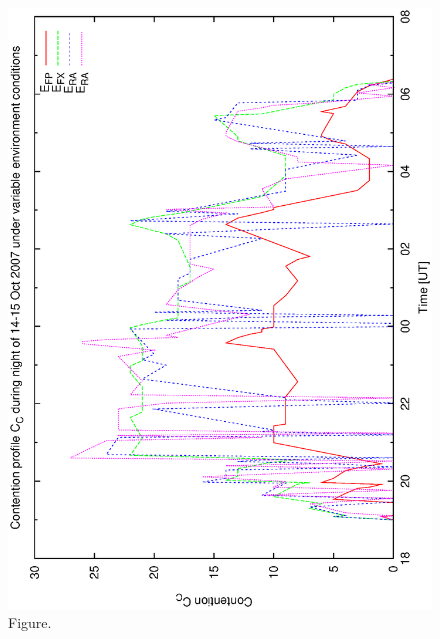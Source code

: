 \documentclass[12pt,a4paper]{article}
\begin{document}
\begin{figure}[htbp]
 \begin{center}
  \includegraphics[scale=1.0, angle=0]{figures/bsa_combine_cont.eps}
 \end{center}
  \caption[Figure.]
{Figure.}
\end{figure}
\clearpage
\end{document}
